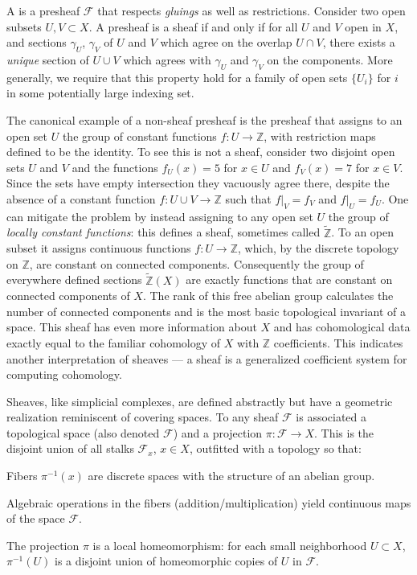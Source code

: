 \documentclass{psapm-l}
\theoremstyle{definition}
\theoremstyle{remark}
\numberwithin{equation}{section}
\begin{document}
A {{}} is a presheaf ${{\mathcal F}}$ that respects {\em gluings} as well as restrictions. Consider two open subsets $U, V\subset X$.
A presheaf is a sheaf if and only if for all $U$ and $V$ open in $X$, and sections ${{\gamma}}_U$, ${{\gamma}}_V$ of $U$ and $V$ which agree on the overlap $U\cap V$, there exists a {\em unique} section of $U\cup V$ which agrees with ${{\gamma}}_U$ and ${{\gamma}}_V$ on the components. More generally, we require that this property hold for a family of open sets $\{U_i\}$ for $i$ in some potentially large indexing set.

The canonical example of a non-sheaf presheaf is the presheaf that assigns to an open set $U$ the group of constant functions $f:U\to{{\mathbb Z}}$, with restriction maps defined to be the identity. To see this is not a sheaf, consider two disjoint open sets $U$ and $V$ and the functions $f_U(x)=5$ for $x\in U$ and $f_V(x)=7$ for $x\in V$. Since the sets have empty intersection they vacuously agree there, despite the absence of a constant function $f:U\cup V\to{{\mathbb Z}}$ such that $f|_V=f_V$ and $f|_U=f_U$. One can mitigate the problem by instead assigning to any open set $U$ the group of {\em locally constant functions}: this defines a sheaf, sometimes called $\widetilde{{\mathbb Z}}$. To an open subset it assigns continuous functions $f:U\to{{\mathbb Z}}$, which, by the discrete topology on ${{\mathbb Z}}$, are constant on connected components. Consequently the group of everywhere defined sections $\widetilde{{\mathbb Z}}(X)$ are exactly functions that are constant on connected components of $X$. The rank of this free abelian group calculates the number of connected components and is the most basic topological invariant of a space. This sheaf has even  more information about $X$ and has cohomological data exactly equal to the familiar cohomology of $X$ with ${{\mathbb Z}}$ coefficients. This indicates another interpretation of sheaves --- a sheaf is a generalized coefficient system for computing cohomology.

Sheaves, like simplicial complexes, are defined abstractly but have a geometric realization reminiscent of covering spaces. To any sheaf ${{\mathcal F}}$ is associated a topological space (also denoted ${{\mathcal F}}$) and a projection ${{\pi}}\colon{{\mathcal F}}\to X$. This {{}} is the disjoint union of all stalks ${{\mathcal F}}_x$, $x\in X$, outfitted with a topology so that:
\begin{enumerate*}
    \item Fibers ${{\pi}}{^{-1}}(x)$ are discrete spaces with the structure of an abelian group.
    \item Algebraic operations in the fibers (addition/multiplication) yield continuous maps of the space ${{\mathcal F}}$.
    \item The projection ${{\pi}}$ is a local homeomorphism: for each small neighborhood $U\subset X$, ${{\pi}}{^{-1}}(U)$ is a disjoint union of homeomorphic copies of $U$ in ${{\mathcal F}}$.
\end{enumerate*}
\end{document}
